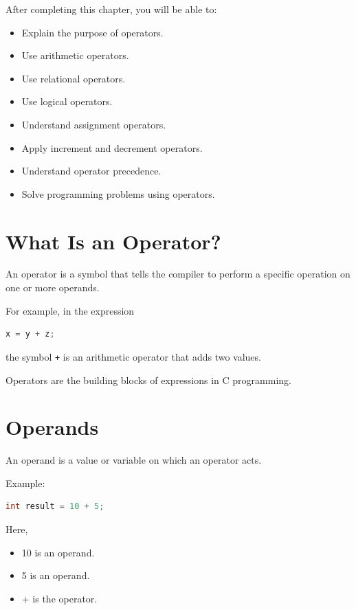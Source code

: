 \documentclass[12pt,openany]{book}
\begin{document}
After completing this chapter, you will be able to:

\begin{itemize}
\item Explain the purpose of operators.
\item Use arithmetic operators.
\item Use relational operators.
\item Use logical operators.
\item Understand assignment operators.
\item Apply increment and decrement operators.
\item Understand operator precedence.
\item Solve programming problems using operators.
\end{itemize}

\section{What Is an Operator?}

An operator is a symbol that tells the compiler to perform a specific operation on one or more operands.

For example, in the expression

\begin{lstlisting}[language=C]
x = y + z;
\end{lstlisting}

the symbol \texttt{+} is an arithmetic operator that adds two values.

Operators are the building blocks of expressions in C programming.

\section{Operands}

An operand is a value or variable on which an operator acts.

Example:

\begin{lstlisting}[language=C]
int result = 10 + 5;
\end{lstlisting}

Here,

\begin{itemize}
\item 10 is an operand.
\item 5 is an operand.
\item + is the operator.
\end{itemize}
\end{document}
